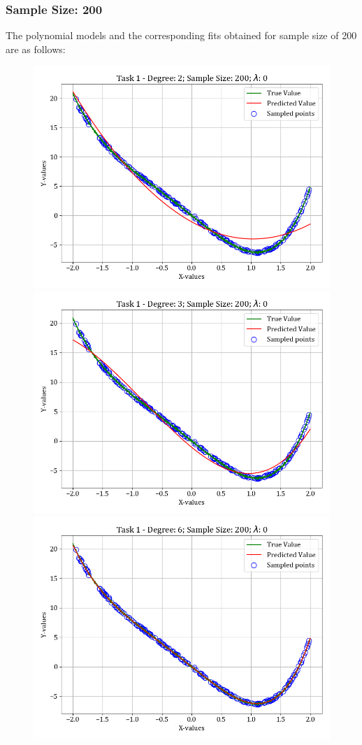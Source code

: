 \documentclass[12pt,a4paper]{article}
\begin{document}
\subsubsection{Sample Size: 200}
The polynomial models and the corresponding fits obtained for sample size of 200 are as follows:
\begin{figure}[H]
    \includegraphics[scale=0.425]{images/t1_d1/d_2_size_200_l_0.png}
    \includegraphics[scale=0.425]{images/t1_d1/d_3_size_200_l_0.png}
    \includegraphics[scale=0.425]{images/t1_d1/d_6_size_200_l_0.png}

\end{figure}
\end{document}
